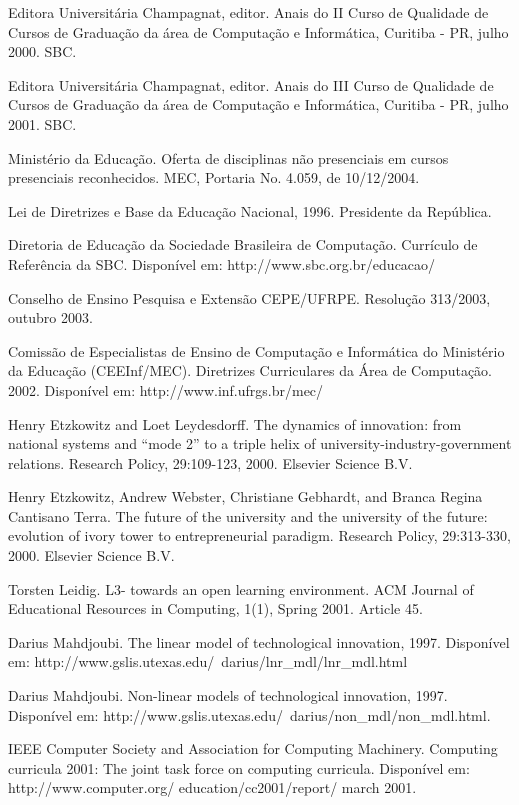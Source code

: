 \documentclass[
	12pt,				%
	openright,			%
  oneside,     %
	a4paper,			%
	english,			%
	french,				%
	spanish,			%
	brazil				%
	]{abntex2}
\begin{document}
\noindent Editora Universitária Champagnat, editor. Anais do II Curso de Qualidade de Cursos de Graduação da área de Computação e Informática, Curitiba - PR, julho 2000. SBC.

\noindent Editora Universitária Champagnat, editor. Anais do III Curso de Qualidade de Cursos de Graduação da área de Computação e Informática, Curitiba - PR, julho 2001. SBC.

\noindent Ministério da Educação.  Oferta de disciplinas não presenciais em cursos presenciais reconhecidos.  MEC, Portaria No. 4.059, de 10/12/2004.

 
\noindent Lei de Diretrizes e Base da Educação Nacional, 1996. Presidente da República.

\noindent Diretoria de Educação da Sociedade Brasileira de Computação. Currículo de Referência da SBC. Disponível em: http://www.sbc.org.br/educacao/

\noindent Conselho de Ensino Pesquisa e Extensão CEPE/UFRPE. Resolução 313/2003, outubro 2003.

\noindent Comissão de Especialistas de Ensino de Computação e Informática do Ministério da Educação (CEEInf/MEC). Diretrizes Curriculares da Área de Computação. 2002.  Disponível em: http://www.inf.ufrgs.br/mec/

\noindent Henry Etzkowitz and Loet Leydesdorff. The dynamics of innovation: from national systems and ``mode 2'' to a triple helix of university-industry-government relations. Research Policy, 29:109-123, 2000. Elsevier Science B.V.

\noindent Henry Etzkowitz, Andrew Webster, Christiane Gebhardt, and Branca Regina Cantisano Terra. The future of the university and the university of the future: evolution of ivory tower to entrepreneurial paradigm. Research Policy, 29:313-330, 2000. Elsevier Science B.V.

\noindent Torsten Leidig. L3- towards an open learning environment. ACM Journal of Educational Resources in Computing, 1(1), Spring 2001. Article 45.

\noindent Darius Mahdjoubi. The linear model of technological innovation, 1997. Disponível em: http://www.gslis.utexas.edu/~darius/lnr\_mdl/lnr\_mdl.html

\noindent Darius Mahdjoubi. Non-linear models of technological innovation, 1997. Disponível em: http://www.gslis.utexas.edu/~darius/non\_mdl/non\_mdl.html.

\noindent IEEE Computer Society and Association for Computing Machinery. Computing curricula 2001: The joint task force on computing curricula.  Disponível em: http://www.computer.org/ education/cc2001/report/ march 2001.
%
%
\end{document}
